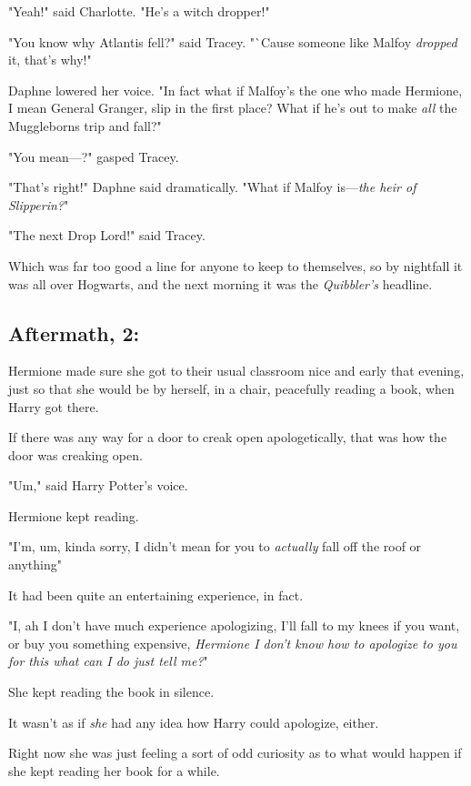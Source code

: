 "Yeah!" said Charlotte. "He's a witch dropper!"

"You know why Atlantis fell?" said Tracey. "`Cause someone like Malfoy
\emph{dropped} it, that's why!"

Daphne lowered her voice. "In fact{\el} what if Malfoy's the one who made
Hermione, I mean General Granger, slip in the first place? What if he's out to
make \emph{all} the Muggleborns trip and fall?"

"You mean—?" gasped Tracey.

"That's right!" Daphne said dramatically. "What if Malfoy is—\emph{the heir
of Slipperin?}"

"The next Drop Lord!" said Tracey.

Which was far too good a line for anyone to keep to themselves, so by nightfall
it was all over Hogwarts, and the next morning it was the \emph{Quibbler's}
headline.
\sbreak
\vspace{-2\baselineskip}
\subsection{Aftermath, 2:}

Hermione made sure she got to their usual classroom nice and early that
evening, just so that she would be by herself, in a chair, peacefully reading a
book, when Harry got there.

If there was any way for a door to creak open apologetically, that was how the
door was creaking open.

"Um," said Harry Potter's voice.

Hermione kept reading.

"I'm, um, kinda sorry, I didn't mean for you to \emph{actually} fall off the
roof or anything{\el}"

It had been quite an entertaining experience, in fact.

"I, ah{\el} I don't have much experience apologizing, I'll fall to my knees
if you want, or buy you something expensive, \emph{Hermione I don't know how to
apologize to you for this what can I do just tell me?}"

She kept reading the book in silence.

It wasn't as if \emph{she} had any idea how Harry could apologize, either.

Right now she was just feeling a sort of odd curiosity as to what would happen
if she kept reading her book for a while.
